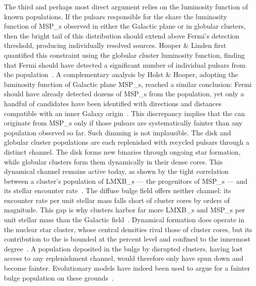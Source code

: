 The third and perhaps most direct argument relies on the luminosity function of known \MSP populations.
If the pulsars responsible for the \GCE share the luminosity function of \glspl{MSP_} observed in either the Galactic plane or in globular clusters, then the bright tail of this distribution should extend above Fermi's detection threshold, producing individually resolved sources.
Hooper \& Linden first quantified this constraint using the globular cluster \MSP luminosity function, finding that Fermi should have detected a significant number of individual pulsars from the \GCE population~\cite{Hooper:2016rap}.
A complementary analysis by Holst \& Hooper, adopting the luminosity function of Galactic plane \glspl{MSP_}, reached a similar conclusion: Fermi should have already detected dozens of \glspl{MSP_} from the \GCE population, yet only a handful of candidates have been identified with directions and distances compatible with an inner Galaxy origin~\cite{Holst:2024fvb}.
This discrepancy implies that the \GCE can originate from \glspl{MSP_} only if those pulsars are systematically fainter than any \MSP population observed so far.
Such dimming is not implausible. The disk and globular cluster populations are each replenished with recycled pulsars through a distinct channel. The disk forms new binaries through ongoing star formation, while globular clusters form them dynamically in their dense cores. This dynamical channel remains active today, as shown by the tight correlation between a cluster's population of \glspl{LMXB_} --- the progenitors of \glspl{MSP_} --- and its stellar encounter rate~\cite{Pooley:2003zb,Bahramian:2013ihw}. The diffuse bulge field offers neither channel: its encounter rate per unit stellar mass falls short of cluster cores by orders of magnitude. This gap is why clusters harbor far more \glspl{LMXB_} and \glspl{MSP_} per unit stellar mass than the Galactic field~\cite{Ransom:2007cn}. Dynamical formation does operate in the nuclear star cluster, whose central densities rival those of cluster cores, but its contribution to the \GCE is bounded at the percent level and confined to the innermost degree~\cite{Eckner:2017oul}. A population deposited in the bulge by disrupted clusters, having lost access to any replenishment channel, would therefore only have spun down and become fainter.
Evolutionary models have indeed been used to argue for a fainter bulge population on these grounds~\cite{Fragione:2017rsp,Ploeg:2020jeh,Ye:2022yxt}.
